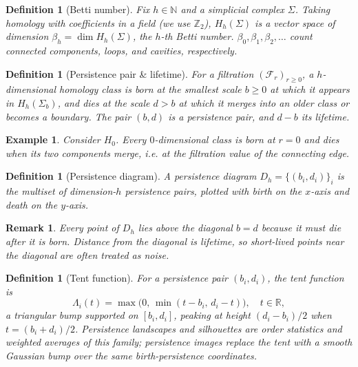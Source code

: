 \documentclass[11pt,letterpaper]{article}
\newcommand{\R}{\mathbb{R}}
\newcommand{\N}{\mathbb{N}}
\newcommand{\Z}{\mathbb{Z}}
\newcommand{\1}{\mathds{1}}
\newcommand{\simpcom}{\Sigma}
\newcommand{\filt}{\mathcal{F}}
\theoremstyle{plain}
\theoremstyle{definitioncolon}
\newtheorem{definition}[theorem]{Definition}
\newtheorem*{example}{Example}
\newtheorem*{remark}{Remark}
\begin{document}
    \begin{definition}[Betti number]
    \label{def:betti}
        Fix $h \in \N$ and a simplicial complex $\Sigma$. Taking homology
        with coefficients in a field (we use $\Z_2$), $H_h(\simpcom)$ is a
        vector space of dimension $\beta_h = \dim H_h(\simpcom)$, the $h$-th
        \emph{Betti number}. $\beta_0, \beta_1, \beta_2, \dots$ count connected
        components, loops, and cavities, respectively.
    \end{definition}

    \begin{definition}[Persistence pair \& lifetime]
    \label{def:pers-pair}
        For a filtration $(\filt_r)_{r \geq 0}$, a $h$-dimensional homology
        class is \emph{born} at the smallest scale $b \geq 0$ at which it
        appears in $H_h(\simpcom_b)$, and \emph{dies} at the scale $d > b$ at
        which it merges into an older class or becomes a boundary. The pair
        $(b,d)$ is a \emph{persistence pair}, and $d - b$ its \emph{lifetime}.
    \end{definition}

    \begin{example}
        Consider $H_0$. Every $0$-dimensional class is born at $r=0$ and dies
        when its two components merge, i.e. at the filtration value of the
        connecting edge.
    \end{example}

    \begin{definition}[Persistence diagram]
    \label{def:pd}
        A persistence diagram $D_h = \{(b_i, d_i)\}_i$ is the multiset of
        dimension-$h$ persistence pairs, plotted with birth on the $x$-axis and
        death on the $y$-axis.
    \end{definition}

    \begin{remark}
        Every point of $D_h$ lies above the diagonal $b=d$ because it must die
        after it is born. Distance from the diagonal is lifetime, so short-lived
        points near the diagonal are often treated as noise.
    \end{remark}

    \begin{definition}[Tent function]
    \label{def:tent}
        For a persistence pair $(b_i, d_i)$, the tent function is
            \[
            \Lambda_i(t) = \max\bigl(0,\, \min(t - b_i,\, d_i - t)\bigr),
            \quad t \in \R,
            \]
        a triangular bump supported on $[b_i, d_i]$, peaking at height
        $(d_i-b_i)/2$ when $t = (b_i+d_i)/2$. Persistence landscapes and
        silhouettes are order statistics and weighted averages of this family;
        persistence images replace the tent with a smooth Gaussian bump over
        the same birth-persistence coordinates.
    \end{definition}
\end{document}
